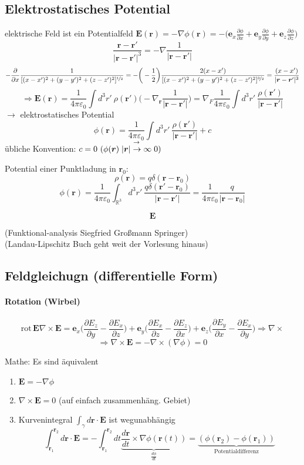 \documentclass[titlepage,11pt,a4paper,ngerman]{report}
\newcommand{\prt}[2]{\frac{\partial #1}{\partial #2}}
\newcommand{\kq}{\frac{1}{4\pi\epsilon_0}}
\newcommand{\intt}[2]{\int_{#1}^{#2}}
\renewcommand{\vec}[1]{\boldsymbol{#1}}
\newcommand{\lcom}[1]{\color{MidnightBlue}#1\color{black}}
\renewcommand{\epsilon}{\varepsilon}
\begin{document}
\subsection{Elektrostatisches Potential}
elektrische Feld ist ein Potentialfeld $\vec{E}(\vec{r}) = - \nabla\phi(\vec{r}) = - \bigg( \vec{e}_x \prt{\phi}{x} + \vec{e}_y \prt{\phi}{y} + \vec{e}_z \prt{\phi}{z}\bigg)$
$$\frac{\vec{r} - \vec{r}'}{|\vec{r} - \vec{r}'|^3} = -\nabla\frac{1}{|\vec{r}-\vec{r}'|}$$
$$-\prt{}{x} \frac{1}{[(x-x')^2 + (y-y')^2 + (z-z')^2]^{\nicefrac{1}{2}}} = - \bigg(-\frac{1}{2}\bigg) \frac{2(x-x')}{[(x-x')^2 + (y-y')^2 + (z-z')^2]^{\nicefrac{3}{2}}} = \frac{(x-x')}{|\vec{r} - \vec{r}'|^3}$$
$$\Rightarrow \vec{E}(\vec{r}) = \kq \int d^3 r'\ \rho(\vec{r}') \bigg(-\nabla_{\vec{r}} \frac{1}{|\vec{r} - \vec{r}'|} \bigg) = \nabla_F \kq \int d^3 r'\ \frac{\rho(\vec{r}')}{|\vec{r} - \vec{r}'|}$$
$\rightarrow$ elektrostatisches Potential
$$\phi(\vec{r}) = \kq \int d^3 r'\ \frac{\rho(\vec{r}')}{|\vec{r} - \vec{r}'|} + c$$
übliche Konvention: $c = 0\ (\phi(\vec{r})\buildrel{\rightarrow}\over{|\vec{r}| \to \infty} 0)$

Potential einer Punktladung in $\vec{r}_0$:
$$\rho(\vec{r}) = q \delta(\vec{r}-\vec{r}_0)$$
$$\phi(\vec{r}) = \kq \int_{\mathbb R^3} d^3 r'\ \frac{q\delta(\vec{r}' - \vec{r}_0)}{|\vec{r}-\vec{r}'|} = \kq \frac{q}{|\vec{r} - \vec{r}_0|}$$

$$\vec{E}$$



\lcom{(Funktional-analysis Siegfried Großmann Springer)\\
	(Landau-Lipschitz Buch geht weit der Vorlesung hinaus)}

\subsection{Feldgleichugn (differentielle Form)}

\paragraph{Rotation (Wirbel)}
$$\textrm{rot}\, \vec{E} \nabla \times \vec{E} = \vec{e}_x \bigg(\prt{E_z}{y} - \prt{E_x}{z}\bigg) + \vec{e}_y \bigg(\prt{E_x}{z} - \prt{E_z}{x}\bigg) + \vec{e}_z \bigg(\prt{E_y}{x} - \prt{E_x}{y}\bigg) \Rightarrow \nabla \times$$
$$\Rightarrow \nabla \times \vec{E} = - \nabla \times (\nabla\phi) = 0$$

Mathe: Es sind äquivalent 
\begin{enumerate}[i]
	\item $\vec{E} = - \nabla\phi$
	\item $\nabla \times \vec{E} = 0$ (auf einfach zusammenhäng. Gebiet)
	\item Kurvenintegral $\int_\gamma d\vec{r} \cdot \vec{E}$ ist wegunabhängig %
	$$\intt{\vec{r}_1}{\vec{r}_2} d\vec{r} \cdot \vec{E} = - \intt{\vec{r}_1}{\vec{r}_2} dt \underbrace{\frac{d\vec{r}}{dt}\times \nabla\phi(\vec{r}(t))}_{\frac{d\phi}{dt}} = \underbrace{(\phi(\vec{r}_2) - \phi(\vec{r}_1))}_{\textrm{Potentialdifferenz}} $$
\end{enumerate}
\end{document}

